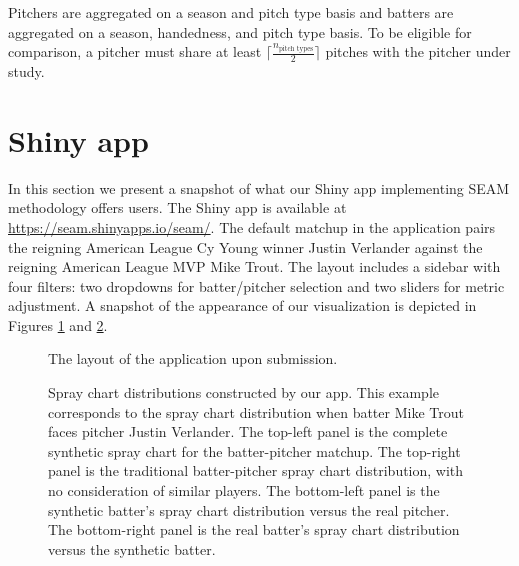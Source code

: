 \documentclass[12pt]{article}
\begin{document}
Pitchers are aggregated on a season and pitch type basis and batters are aggregated on a season, handedness, and pitch type basis. To be eligible for comparison, a pitcher must share at least  $\lceil \frac{n_{\text{pitch types}}}{2} \rceil$ pitches with the pitcher under study. 

 


\section{Shiny app}

In this section we present a snapshot of what our Shiny app implementing SEAM methodology offers users. The Shiny app is available at \url{https://seam.shinyapps.io/seam/}. The default matchup in the application pairs the reigning American League Cy Young winner Justin Verlander against the reigning American League MVP Mike Trout. The layout includes a sidebar with four filters: two dropdowns for batter/pitcher selection and two sliders for metric adjustment. A snapshot of the appearance of our visualization is depicted in Figures \ref{layout} and \ref{spraydists}.


\begin{figure}
\centering
{}
    \caption{The layout of the application upon submission.}
    \label{layout}
\end{figure}

\begin{figure}
\centering
{}
    \caption{Spray chart distributions constructed by our app.  This example 
    corresponds to the spray chart distribution when batter Mike Trout faces 
    pitcher Justin Verlander.
    The top-left panel is the complete synthetic spray chart for 
      the batter-pitcher matchup.
    The top-right panel is the traditional batter-pitcher spray chart 
      distribution, with no consideration of similar players.
    The bottom-left panel is the synthetic batter's spray chart distribution 
      versus the real pitcher. 
    The bottom-right panel is the real batter's spray chart distribution 
      versus the synthetic batter.}
    \label{spraydists}
\end{figure}
\end{document}
